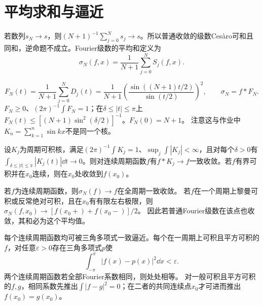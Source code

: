 \section{平均求和与逼近}
\begin{result}\label{st:Cesaro}
若数列$s_N\to s$，则$(N+1)^{-1}\sum_{j=0}^Ns_j\to s$。所以普通收敛的级数Ces\`aro可和且同和，逆命题不成立。Fourier级数的平均和定义为
\[
 \sigma_N(f,x)=\frac1{N+1}\sum_{j=0}^NS_j(f,x).
\]
\end{result}
\begin{result}\label{st:Fejerkernel}
\[
 F_N(t)=\frac1{N+1}\sum_{j=0}^ND_j(t)
 =\frac1{N+1}\left(\frac{\sin((N+1)t/2)}{\sin(t/2)}\right)^2,
 \qquad\sigma_N=f*F_N.
\]
$F_N\ge0$、$(2\pi)^{-1}\int F_N=1$；在$\delta\le|t|\le\pi$上
$F_N(t)\le[(N+1)\sin^2(\delta/2)]^{-1}$。$F_N(0)=N+1$。
注意这与作业中$K_n=\sum_{k=1}^n\sin kx$不是同一个核。
\end{result}
\begin{result}[好核的逼近恒等性质]\label{st:goodkernel}
设$K_j$为周期可积核，满足$(2\pi)^{-1}\int K_j=1$、$\sup_j\int|K_j|<\infty$，且对每个$\delta>0$有$\int_{\delta\le|t|\le\pi}|K_j(t)|\dd t\to0$。则对连续周期函数$f$有$f*K_j\to f$一致收敛。若$f$有界可积并在$x_0$连续，则在$x_0$处收敛到$f(x_0)$。
\end{result}
\begin{result}\label{st:Fejer}
若$f$为连续周期函数，则$\sigma_N(f)\to f$在全周期一致收敛。
若$f$在一个周期上黎曼可积或反常绝对可积，且在$x_0$有有限左右极限，则
$\sigma_N(f,x_0)\to[f(x_0+)+f(x_0-)]/2$。
因此若普通Fourier级数在该点也收敛，其和必为这个平均值。
\end{result}
\begin{result}[三角多项式逼近与连续函数的唯一性]\label{st:density}
每个连续周期函数均可被三角多项式一致逼近。每个在一周期上可积且平方可积的$f$，对任意$\varepsilon>0$存在三角多项式$p$使
\[
 \int_{-\pi}^{\pi}|f(x)-p(x)|^2\dd x<\varepsilon.
\]
两个连续周期函数若全部Fourier系数相同，则处处相等。
对一般可积且平方可积的$f,g$，相同系数先推出$\int|f-g|^2=0$；在二者的共同连续点$x_0$才可进而推出$f(x_0)=g(x_0)$。
\end{result}


